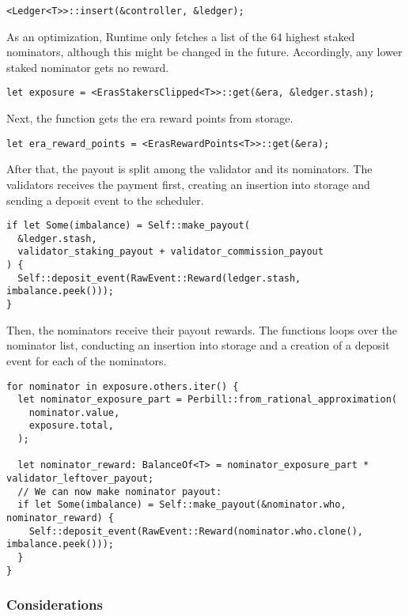 \documentclass[11pt,a4paper]{article}
\begin{document}
\begin{verbatim}
<Ledger<T>>::insert(&controller, &ledger);
\end{verbatim}

As an optimization, Runtime only fetches a list of the 64 highest staked
nominators, although this might be changed in the future. Accordingly, any lower
staked nominator gets no reward. 

\begin{verbatim}
let exposure = <ErasStakersClipped<T>>::get(&era, &ledger.stash);
\end{verbatim}

Next, the function gets the era reward points from storage.

\begin{verbatim}
let era_reward_points = <ErasRewardPoints<T>>::get(&era);
\end{verbatim}

After that, the payout is split among the validator and its nominators. The
validators receives the payment first, creating an insertion into storage and
sending a deposit event to the scheduler.

\begin{verbatim}
if let Some(imbalance) = Self::make_payout(
  &ledger.stash,
  validator_staking_payout + validator_commission_payout
) {
  Self::deposit_event(RawEvent::Reward(ledger.stash, imbalance.peek()));
}
\end{verbatim}

Then, the nominators receive their payout rewards. The functions loops over the
nominator list, conducting an insertion into storage and a creation of a deposit
event for each of the nominators.

\begin{verbatim}
for nominator in exposure.others.iter() {
  let nominator_exposure_part = Perbill::from_rational_approximation(
    nominator.value,
    exposure.total,
  );

  let nominator_reward: BalanceOf<T> = nominator_exposure_part * validator_leftover_payout;
  // We can now make nominator payout:
  if let Some(imbalance) = Self::make_payout(&nominator.who, nominator_reward) {
    Self::deposit_event(RawEvent::Reward(nominator.who.clone(), imbalance.peek()));
  }
}
\end{verbatim}

\subsubsection{Considerations}
\end{document}
